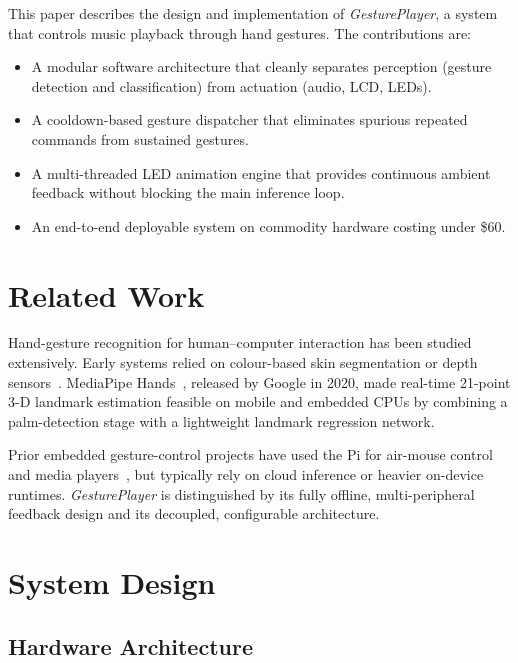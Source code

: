 \documentclass[sigconf, nonacm]{acmart}
\begin{document}
This paper describes the design and implementation of \textit{GesturePlayer}, a system that controls music playback through hand gestures. The contributions are:
\begin{itemize}
  \item A modular software architecture that cleanly separates perception (gesture detection and classification) from actuation (audio, LCD, LEDs).
  \item A cooldown-based gesture dispatcher that eliminates spurious repeated commands from sustained gestures.
  \item A multi-threaded LED animation engine that provides continuous ambient feedback without blocking the main inference loop.
  \item An end-to-end deployable system on commodity hardware costing under \$60.
\end{itemize}

\section{Related Work}

Hand-gesture recognition for human--computer interaction has been studied extensively. Early systems relied on colour-based skin segmentation or depth sensors~\cite{rautaray2015}. MediaPipe Hands~\cite{mediapipe2020}, released by Google in 2020, made real-time 21-point 3-D landmark estimation feasible on mobile and embedded CPUs by combining a palm-detection stage with a lightweight landmark regression network.

Prior embedded gesture-control projects have used the Pi for air-mouse control~\cite{pi_mouse} and media players~\cite{pi_gesture_media}, but typically rely on cloud inference or heavier on-device runtimes. \textit{GesturePlayer} is distinguished by its fully offline, multi-peripheral feedback design and its decoupled, configurable architecture.

\section{System Design}

\subsection{Hardware Architecture}
\end{document}
